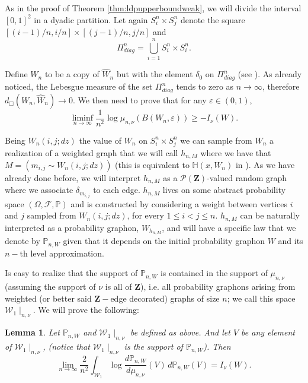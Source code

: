 \documentclass[12pt,twoside,a4paper]{article}
\newtheorem{lemma}[theorem]{Lemma}
\newcommand{\Square}{{S^n_i\times S^n_j}}
\newcommand{\SquareDiag}{{\Pi^n_{diag}}}
\newcommand{\SquareDiagI}{{S^n_i\times S^n_i}}
\newcommand{\Space}{\mathbf{Z}}
\begin{document}
As in the proof of Theorem \ref{thm:ldpupperboundweak}, we will divide the interval $[0,1]^2$ in a dyadic partition. Let again $\Square$ denote the square $[(i-1)/n,i/n] \times [(j-1)/n,j/n]$ and
\[
\SquareDiag = \bigcup_{i=1}^{n} \SquareDiagI.
\]

Define $W_n$ to be a copy of $\widehat{W}_n$ but with the element $\delta_0$ on $\SquareDiag$ (see \cite[Remark 6.2]{abraham2023probabilitygraphons}). As already noticed, the Lebesgue measure of the set $\SquareDiag$ tends to zero as $n \to \infty$, therefore $d_{\Box}(W_n, \widehat{W}_n) \to 0$. We then need to prove that for any $\varepsilon \in (0,1)$,
\begin{equation}\label{eq:finalapprox}
\liminf_{n \to \infty} \frac{1}{n^2} \log \mu_{n,\nu}(B(W_n,\varepsilon)) \geq -I_\nu(W).     
\end{equation}

Being $W_n(i,j;dz)$ the value of  $W_n$ on $\Square$ we can sample from $W_n$ a realization of a weighted graph  that we will call $h_{n,M}$ where we have that $M=(m_{i,j}\sim W_n(i,j;dz))$ (this is equivalent to $\mathbb{H}(x,W_n)$ in \cite{abraham2023probabilitygraphons}). As we have already done before, we will interpret $h_{n,M}$ as a $\mathcal{P}(\Space)$-valued random graph where we associate $\delta_{m_{i,j}}$ to each edge. $h_{n,M}$ lives on some abstract probability space $(\Omega, \mathscr{F}, \mathbb{P})$ and is constructed by considering a weight between vertices $i$ and $j$ sampled from $W_n(i,j;dz)$, for every $1 \leq i < j \leq n$.
 $h_{n,M}$ can be naturally interpreted as a probability graphon, $W_{h_{n,M}}$, and will have a specific law that we denote by $\mathbb{P}_{n,W}$ given that it depends on the initial probability graphon $W$ and its $n-$th level approximation.


Is easy to realize that the support of $\mathbb{P}_{n,W}$ is contained in the support of $\mu_{n,\nu}$ (assuming the support of $\nu$ is all of $\Space$), i.e. all probability graphons arising from weighted (or better said
 $\Space-$edge decorated) graphs of size $n$; we call this space $\mathcal{W}_1\mid_{n,\nu}$. We will prove the following:

\begin{lemma}\label{lem:radonnykodym}
Let $\mathbb{P}_{n,W}$ and $\mathcal{W}_1\mid_{n,\nu}$ be defined as above. And let $V$ be any element of $\mathcal{W}_1\mid_{n,\nu}$, (notice that $\mathcal{W}_1\mid_{n,\nu}$ is the support of $\mathbb{P}_{n,W}$). Then
\[
\lim_{n \to \infty} \frac{2}{n^2} \int_{\mathcal{W}_1} \log \frac{d\mathbb{P}_{n,W}}{d\mu_{n,\nu}}(V) \, d\mathbb{P}_{n,W}(V) = I_\nu(W).
\]
\end{lemma}
\end{document}
